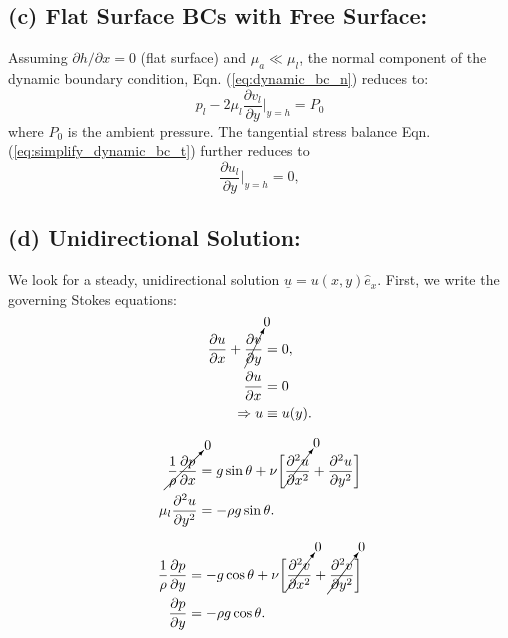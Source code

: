 \documentclass{article}
\begin{document}
\subsection*{(c) Flat Surface BCs with Free Surface:}
Assuming $\partial h/ \partial x = 0$ (flat surface) and $\mu_{a} \ll \mu_{l}$, the normal component of the dynamic boundary condition, Eqn. (\ref{eq:dynamic_bc_n}) reduces to:
\begin{equation}\label{eq:free_surface_n}
 p_{l} - 2\mu_{l} \frac{\partial v_{l}}{\partial y}\bigg|_{y = h}  = P_{0}
\end{equation}
where $P_{0}$ is the ambient pressure. 
The tangential stress balance Eqn.(\ref{eq:simplify_dynamic_bc_t}) further reduces to
\begin{equation}\label{eq:free_surface_t}
 \frac{\partial u_{l}}{\partial y}\bigg|_{y = h} = 0,
\end{equation}
\subsection*{(d) Unidirectional Solution:}
We look for a steady, unidirectional solution $\underline{u} = u(x, y) \hat{e}_{x}$. First, we write the governing Stokes equations:
\begin{align}\label{eq:conserve_mass}
 \frac{\partial u}{\partial x} + \cancelto{0}{\frac{\partial v}{\partial y}} &= 0, \\
 \frac{\partial u}{\partial x} & = 0\\
 \Rightarrow u & \equiv u(y). 
\end{align}

\begin{align}\label{eq:conserve_x_mom}
 \cancelto{0}{\frac{1}{\rho} \frac{\partial p}{\partial x} }& = g \sin{\theta} + \nu \bigg[\cancelto{0}{\frac{\partial^{2}u }{\partial x^{2}} } + \frac{\partial^{2}u }{\partial y^{2}}\bigg]\\
 \mu_{l} \frac{\partial^{2}u }{\partial y^{2}} & = -\rho g \sin{\theta}.
\end{align}

\begin{align}\label{eq:conserve_y_mom}
 \frac{1}{\rho} \frac{\partial p}{\partial y} & = -g \cos{\theta} + \nu \bigg[\cancelto{0}{\frac{\partial^{2}v }{\partial x^{2}} } + \cancelto{0} {\frac{\partial^{2}v }{\partial y^{2}} }\bigg]\\
 \frac{\partial p}{\partial y} & = -\rho g \cos{\theta}.
\end{align}
\end{document}
